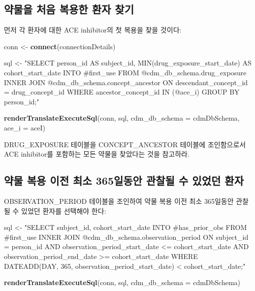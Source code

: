 \documentclass[11pt]{book}
\newenvironment{Shaded}{\begin{snugshade}}{\end{snugshade}}
\newcommand{\KeywordTok}[1]{\textcolor[rgb]{0.13,0.29,0.53}{\textbf{#1}}}
\newcommand{\DataTypeTok}[1]{\textcolor[rgb]{0.13,0.29,0.53}{#1}}
\newcommand{\StringTok}[1]{\textcolor[rgb]{0.31,0.60,0.02}{#1}}
\newcommand{\NormalTok}[1]{#1}
\theoremstyle{definition}
\theoremstyle{definition}
\theoremstyle{definition}
\theoremstyle{remark}
\begin{document}
\subsection{약물을 처음 복용한 환자 찾기}\label{----}

먼저 각 환자에 대한 ACE inhibitor의 첫 복용을 찾을 것이다:

\begin{Shaded}
\begin{Highlighting}[]
\NormalTok{conn <-}\StringTok{ }\KeywordTok{connect}\NormalTok{(connectionDetails)}

\NormalTok{sql <-}\StringTok{ "SELECT person_id AS subject_id,}
\StringTok{  MIN(drug_exposure_start_date) AS cohort_start_date}
\StringTok{INTO #first_use}
\StringTok{FROM @cdm_db_schema.drug_exposure}
\StringTok{INNER JOIN @cdm_db_schema.concept_ancestor}
\StringTok{  ON descendant_concept_id = drug_concept_id}
\StringTok{WHERE ancestor_concept_id IN (@ace_i)}
\StringTok{GROUP BY person_id;"}

\KeywordTok{renderTranslateExecuteSql}\NormalTok{(conn,}
\NormalTok{                          sql,}
                          \DataTypeTok{cdm_db_schema =}\NormalTok{ cdmDbSchema,}
                          \DataTypeTok{ace_i =}\NormalTok{ aceI)}
\end{Highlighting}
\end{Shaded}

DRUG\_EXPOSURE 테이블을 CONCEPT\_ANCESTOR 테이블에 조인함으로서 ACE
inhibitor를 포함하는 모든 약물을 찾았다는 것을 참고하라.

\subsection{약물 복용 이전 최소 365일동안 관찰될 수 있었던
환자}\label{----365----}

OBSERVATION\_PERIOD 테이블을 조인하여 약물 복용 이전 최소 365일동안
관찰될 수 있었던 환자를 선택해야 한다:

\begin{Shaded}
\begin{Highlighting}[]
\NormalTok{sql <-}\StringTok{ "SELECT subject_id,}
\StringTok{  cohort_start_date}
\StringTok{INTO #has_prior_obs}
\StringTok{FROM #first_use}
\StringTok{INNER JOIN @cdm_db_schema.observation_period}
\StringTok{  ON subject_id = person_id}
\StringTok{    AND observation_period_start_date <= cohort_start_date}
\StringTok{    AND observation_period_end_date >= cohort_start_date}
\StringTok{WHERE DATEADD(DAY, 365, observation_period_start_date) < cohort_start_date;"}

\KeywordTok{renderTranslateExecuteSql}\NormalTok{(conn, sql, }\DataTypeTok{cdm_db_schema =}\NormalTok{ cdmDbSchema)}
\end{Highlighting}
\end{Shaded}
\end{document}
